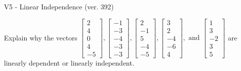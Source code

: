 \begin{exercise}
  \begin{exerciseTitle}V5 - Linear Independence (ver. 392)\end{exerciseTitle}
  \begin{exerciseStatement}
    Explain why the vectors \(\left[\begin{array}{r}
2 \\
4 \\
0 \\
4 \\
-5
\end{array}\right] , \left[\begin{array}{r}
-1 \\
-3 \\
-4 \\
-3 \\
-3
\end{array}\right] , \left[\begin{array}{r}
2 \\
-1 \\
5 \\
-4 \\
-5
\end{array}\right] , \left[\begin{array}{r}
3 \\
2 \\
-4 \\
-6 \\
4
\end{array}\right] , \text{ and } \left[\begin{array}{r}
1 \\
3 \\
-2 \\
3 \\
5
\end{array}\right]\) are linearly dependent or linearly independent.	



\end{exerciseStatement}
\end{exercise}
